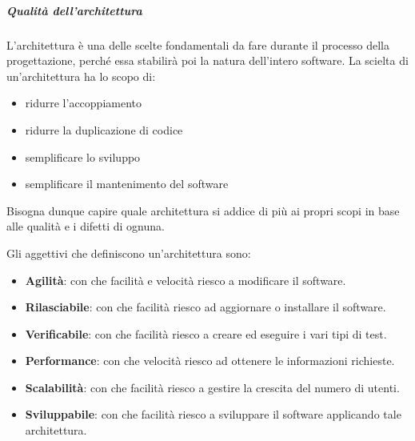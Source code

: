         \subparagraph{Qualità dell'architettura}
        L'architettura è una delle scelte fondamentali da fare durante il processo della progettazione, perché essa stabilirà poi la natura dell'intero software.
        La scielta di un'architettura ha lo scopo di:
        \begin{itemize}
            \item ridurre l'accoppiamento
            \item ridurre la duplicazione di codice
            \item semplificare lo sviluppo
            \item semplificare il mantenimento del software
        \end{itemize}
        Bisogna dunque capire quale architettura si addice di più ai propri scopi in base alle qualità e i difetti di ognuna. \par
        Gli aggettivi che definiscono un'architettura sono:
        \begin{itemize}
            \item \textbf{Agilità}: con che facilità e velocità riesco a modificare il software.
            \item \textbf{Rilasciabile}: con che facilità riesco ad aggiornare o installare il software.
            \item \textbf{Verificabile}: con che facilità riesco a creare ed eseguire i vari tipi di test.
            \item \textbf{Performance}: con che velocità riesco ad ottenere le informazioni richieste.
            \item \textbf{Scalabilità}: con che facilità riesco a gestire la crescita del numero di utenti.
            \item \textbf{Sviluppabile}: con che facilità riesco a sviluppare il software applicando tale architettura.
        \end{itemize}

